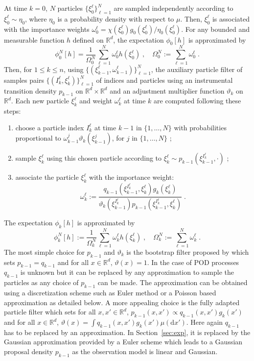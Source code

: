 \documentclass[12pt]{article}
\newcommand{\rmd}{\mathrm{d}}
\newcommand{\eqsp}{\;}
\newcommand{\1}{\mathrm{1}}
\begin{document}
At time $k = 0$, $N$ particles $\{\xi^{\ell}_0\}_{\ell=1}^N$ are sampled independently according to  $\xi^{\ell}_0 \sim \eta_0$, where $\eta_0$ is a probability density with respect to $\mu$. 
Then, $\xi^{\ell}_0$ is associated with the importance weights $\omega_0^{\ell} = \chi(\xi^{\ell}_0)g_0 (\xi^{\ell}_0)/\eta_0(\xi^{\ell}_0)$. 
For any bounded and measurable function $h$ defined on $\mathbb{R}^d$, the expectation $\phi_{0}[h] $ is approximated by
\[
\phi^N_{0}[h] = \frac{1}{\Omega_0^N} \sum_{\ell=1}^N \omega_0^{\ell} h \left(\xi^{\ell}_0 \right)\eqsp, \quad \Omega_0^N:= \sum_{\ell=1}^N \omega_0^{\ell}\eqsp.
\]
Then, for $1\le k \le n$, using $\{(\xi^{\ell}_{k-1},\omega^{\ell}_{k-1})\}_{\ell=1}^N$, the auxiliary particle filter of \cite{pitt:shephard:1999} samples pairs $\{(I^{\ell}_k,\xi^{\ell}_{k})\}_{\ell=1}^N$ of indices and particles using an instrumental transition density $p_{k-1}$ on $\mathbb{R}^d\times \mathbb{R}^d$ and an adjustment multiplier function $\vartheta_k$ on $\mathbb{R}^d$.
 Each new particle $\xi^{\ell}_{k}$ and weight $\omega^{\ell}_k$ at time $k$ are computed following these steps:
\begin{enumerate}[-]
\item choose a particle index $I^{\ell}_k$ at time $k-1$ in $\{1,\ldots,N\}$ with probabilities proportional to $\omega_{k-1}^{j} \vartheta_k (\xi^{j}_{k-1})$, for $j$ in $\{1,\ldots,N\}$ ;
\item sample  $\xi^{\ell}_{k}$ using this chosen particle according to $\xi^{\ell}_{k} \sim p_{k-1}(\xi^{I^{\ell}_k}_{k-1},\cdot)$ ; 
\item  associate the particle $\xi^{\ell}_k$ with the importance weight:
\begin{equation}
\label{eq:importance:weights}
\omega^{\ell}_k := \frac{q_{k-1}(\xi_{k-1}^{I^{\ell}_k},\xi^{\ell}_k)g_k(\xi^{\ell}_k)}{\vartheta_k(\xi^{I^{\ell}_k}_{k-1}) p_{k-1} (\xi_{k-1}^{I^{\ell}_k},\xi^{\ell}_k)}\eqsp.
\end{equation}
\end{enumerate} 
The expectation $\phi_{k}[h]$ is approximated by
\[
\phi^N_{k}[h] := \frac{1}{\Omega_k^N} \sum_{\ell=1}^N \omega_k^{\ell} h \left(\xi^{\ell}_k \right)\eqsp,\quad\Omega_k^N:= \sum_{\ell=1}^N \omega_k^{\ell}\eqsp.
\]
The most simple choice for $p_{k-1}$ and $\vartheta_k$ is the bootstrap filter proposed by \cite{gordon:salmond:smith:1993} which sets $p_{k-1} = q_{k-1}$ and for all $x\in\mathbb{R}^d$, $\vartheta(x) = 1$.
 In the case of POD processes $q_{k-1}$ is unknown but it can be replaced by any approximation to sample the particles as any choice of $p_{k-1}$ can be made.
  The approximation can be obtained using a discretization scheme such as Euler method or a Poisson based approximation as detailed below.
   A more appealing choice is the fully adapted particle filter which sets for all $x,x'\in\mathbb{R}^d$, $p_{k-1}(x,x') \propto q_{k-1}(x,x')g_k(x')$ and for all $x\in\mathbb{R}^d$, $\vartheta(x) = \int q_{k-1}(x,x')g_k(x')\mu(\rmd x')$. Here again $q_{k-1}$ has to be replaced by an approximation. In Section~\ref{sec:exp}, it is replaced by the Gaussian approximation provided by a Euler scheme which leads to a Gaussian proposal density $p_{k-1}$ as the observation model is linear and Gaussian. 
\end{document}
